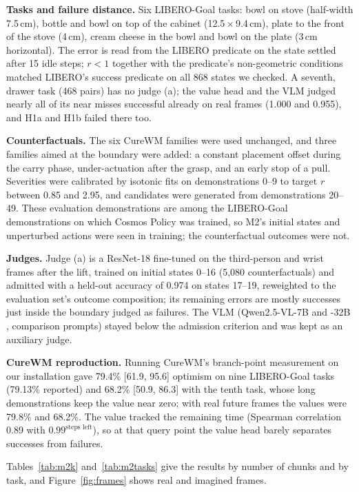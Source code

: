 \documentclass[10pt]{article}
\begin{document}
\textbf{Tasks and failure distance.} Six LIBERO-Goal tasks: bowl on stove (half-width 7.5\,cm), bottle and bowl on top of the cabinet (12.5\,$\times$\,9.4\,cm), plate to the front of the stove (4\,cm), cream cheese in the bowl and bowl on the plate (3\,cm horizontal). The error is read from the LIBERO predicate on the state settled after 15 idle steps; $r<1$ together with the predicate's non-geometric conditions matched LIBERO's success predicate on all 868 states we checked. A seventh, drawer task (468 pairs) has no judge (a); the value head and the VLM judged nearly all of its near misses successful already on real frames (1.000 and 0.955), and H1a and H1b failed there too.

\textbf{Counterfactuals.} The six CureWM families were used unchanged, and three families aimed at the boundary were added: a constant placement offset during the carry phase, under-actuation after the grasp, and an early stop of a pull. Severities were calibrated by isotonic fits on demonstrations 0--9 to target $r$ between 0.85 and 2.95, and candidates were generated from demonstrations 20--49. These evaluation demonstrations are among the LIBERO-Goal demonstrations on which Cosmos Policy was trained, so M2's initial states and unperturbed actions were seen in training; the counterfactual outcomes were not.

\textbf{Judges.} Judge (a) is a ResNet-18 \citep{he2016resnet} fine-tuned on the third-person and wrist frames after the lift, trained on initial states 0--16 (5,080 counterfactuals) and admitted with a held-out accuracy of 0.974 on states 17--19, reweighted to the evaluation set's outcome composition; its remaining errors are mostly successes just inside the boundary judged as failures. The VLM (Qwen2.5-VL-7B and -32B \citep{bai2025qwen25vl, qwen2025qwen25vl32b}, comparison prompts) stayed below the admission criterion and was kept as an auxiliary judge.

\textbf{CureWM reproduction.} Running CureWM's branch-point measurement on our installation gave 79.4\% [61.9, 95.6] optimism on nine LIBERO-Goal tasks (79.13\% reported) and 68.2\% [50.9, 86.3] with the tenth task, whose long demonstrations keep the value near zero; with real future frames the values were 79.8\% and 68.2\%. The value tracked the remaining time (Spearman correlation 0.89 with $0.99^{\text{steps left}}$), so at that query point the value head barely separates successes from failures.

Tables~\ref{tab:m2k} and~\ref{tab:m2tasks} give the results by number of chunks and by task, and Figure~\ref{fig:frames} shows real and imagined frames.
\end{document}
